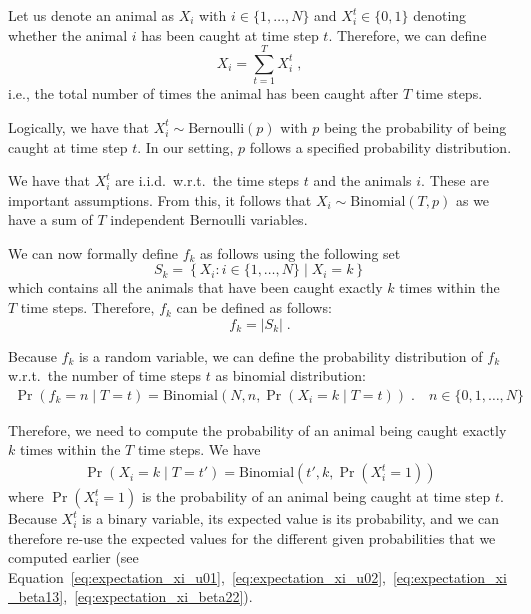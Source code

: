 Let us denote an animal as $X_i$ with $i\in \{1, \dots, N\}$ and $X_i^t\in \{0, 1\}$ denoting whether the animal $i$ has been caught at time step $t$.
Therefore, we can define 
\begin{equation*}
    X_i = \sum_{t=1}^T X_i^t\;,
\end{equation*}
i.e., the total number of times the animal has been caught after $T$ time steps.

Logically, we have that $X_i^t \sim \mathrm{Bernoulli}(p)$ with $p$ being the probability of being caught at time step $t$. In our setting, $p$ follows a specified probability distribution.

We have that $X_i^t$ are i.i.d.\ w.r.t.\ the time steps $t$ and the animals $i$. These are important assumptions.
From this, it follows that $X_i \sim \mathrm{Binomial}(T, p)$ as we have a sum of $T$ independent Bernoulli variables.

We can now formally define $f_k$ as follows using the following set 
\begin{equation*}
    S_k = \left\{ X_i : i \in \{1, \dots, N\} \mid X_i = k \right\}
\end{equation*}
which contains all the animals that have been caught exactly $k$ times within the $T$ time steps.
Therefore, $f_k$ can be defined as follows:
\begin{equation*}
    f_k = |S_k|\;.
\end{equation*}

Because $f_k$ is a random variable, we can define the probability distribution of $f_k$ w.r.t.\ the number of time steps $t$ as binomial distribution:
\begin{align*}
    \Pr(f_k = n\mid T=t) = \mathrm{Binomial}(N, n, \Pr(X_i = k\mid T=t))\;. \quad n \in \{0, 1, \dots, N\}
\end{align*}

Therefore, we need to compute the probability of an animal being caught exactly $k$ times within the $T$ time steps. We have
\begin{align*}
    \Pr(X_i = k \mid T=t') = \mathrm{Binomial}(t', k, \Pr(X_i^t = 1))
\end{align*}
where $\Pr(X_i^t = 1)$ is the probability of an animal being caught at time step $t$.
Because $X_i^t$ is a binary variable, its expected value is its probability, and we can therefore re-use the expected values for the different given probabilities that we computed earlier (see Equation~\ref{eq:expectation_xi_u01},~\ref{eq:expectation_xi_u02},~\ref{eq:expectation_xi_beta13},~\ref{eq:expectation_xi_beta22}).

